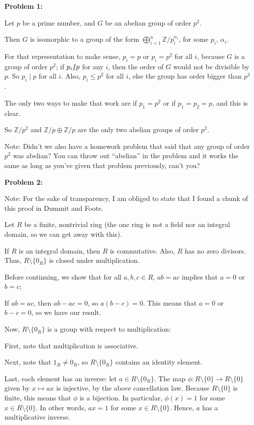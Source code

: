 \documentclass[a4paper,12pt]{article}
\newcommand{\tab}{\hspace{4mm}} %
\newcommand{\shunt}{\vspace{20mm}}
\newcommand{\al}{\alpha} %
\newcommand{\Z}{\mathbb{Z}}
\begin{document}
{\bf Problem 1:}

Let $p$ be a prime number, and $G$ be an abelian group of order $p^2$.

Then $G$ is isomorphic to a group of the form $\bigoplus\limits_{i=1}^n \Z/p_i^{\al_i}$, for some $p_i$, $\al_i$.

For that representation to make sense, $p_i=p$ or $p_i=p^2$ for all $i$, because $G$ is a group of order $p^2$; if $p_i \slashed{\mid} p$ for any $i$, then the order of $G$ would not be divisible by $p$. So $p_i \mid p$ for all $i$. Also, $p_i \leq p^2$ for all $i$, else the group has order bigger than $p^2$.

The only two ways to make that work are if $p_1 = p^2$ or if $p_1=p_2=p$, and this is clear.

So $\Z/p^2$ and $\Z/p \oplus \Z/p$ are the only two abelian groups of order $p^2$.

Note: Didn't we also have a homework problem that said that any group of order $p^2$ was abelian? You can throw out ``abelian'' in the problem and it works the same as long as you've given that problem previously, can't you?

\shunt

{\bf Problem 2:}

Note: For the sake of transparency, I am obliged to state that I found a chunk of this proof in Dummit and Foote.

Let $R$ be a finite, nontrivial ring (the one ring is not a field nor an integral domain, so we can get away with this). 

If $R$ is an integral domain, then $R$ is commutative. Also, $R$ has no zero divisors. Thus, $R \setminus \{0_R\}$ is closed under multiplication.

Before continuing, we show that for all $a,b,c \in R$, $ab=ac$ implies that $a = 0$ or $b=c$;

\tab If $ab=ac$, then $ab-ac=0$, so $a(b-c)=0$. This means that $a=0$ or $b-c=0$, so we have our result.

Now, $R \setminus \{0_R\}$ is a group with respect to multiplication:

\tab First, note that multiplication is associative.

\tab Next, note that $1_R \neq 0_R$, so $R \setminus \{0_R\}$ contains an identity element.

\tab Last, each element has an inverse: let $a \in R \setminus \{0_R\}$. The map $\phi: R \setminus \{0\} \to R \setminus \{0\}$ given by $x \mapsto ax$ is injective, by the above cancellation law. Because $R \setminus \{0\}$ is finite, this means that $\phi$ is a bijection. In particular, $\phi(x)= 1$ for some $x \in R \setminus \{0\}$. In other words, $ax=1$ for some $x \in R \setminus \{0\}$. Hence, $a$ has a multiplicative inverse.
\end{document}
